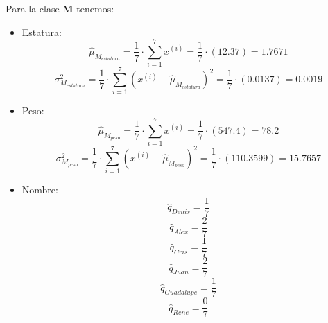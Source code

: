 \documentclass[letterpaper,12pt]{article}
\theoremstyle{definition}
\begin{document}
Para la clase \textbf{M} tenemos:\\
\begin{itemize}
  \item Estatura:
  \begin{equation}
    \hat{\mu}_{M_{estatura}} = \frac{1}{7} \cdot \sum_{i=1}^7 x^{(i)} = \frac{1}{7} \cdot (12.37) = 1.7671
  \end{equation}
  \begin{equation}
    \sigma^2_{M_{estatura}} = \frac{1}{7} \cdot \sum_{i=1}^7 (x^{(i)} - \hat{\mu}_{M_{estatura}})^2 = \frac{1}{7} \cdot (0.0137) = 0.0019
  \end{equation}
  \item Peso:
  \begin{equation}
    \hat{\mu}_{M_{peso}} = \frac{1}{7} \cdot \sum_{i=1}^7 x^{(i)} = \frac{1}{7} \cdot (547.4) = 78.2
  \end{equation}
  \begin{equation}
    \sigma^2_{M_{peso}} = \frac{1}{7} \cdot \sum_{i=1}^7 (x^{(i)} - \hat{\mu}_{M_{peso}})^2 = \frac{1}{7} \cdot (110.3599) = 15.7657
  \end{equation}
  \item Nombre:
  \begin{equation}
    \hat{q}_{Denis} = \frac{1}{7}
  \end{equation}
  \begin{equation}
    \hat{q}_{Alex} = \frac{2}{7}
  \end{equation}
  \begin{equation}
    \hat{q}_{Cris} = \frac{1}{7}
  \end{equation}
  \begin{equation}
    \hat{q}_{Juan} = \frac{2}{7}
  \end{equation}
  \begin{equation}
    \hat{q}_{Guadalupe} = \frac{1}{7}
  \end{equation}
  \begin{equation}
    \hat{q}_{Rene} = \frac{0}{7}
  \end{equation}
\end{itemize}
\end{document}
